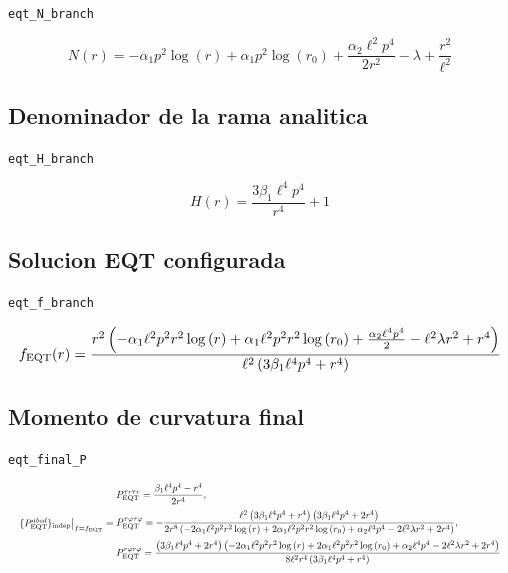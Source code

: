 \documentclass[11pt,a4paper]{article}
\begin{document}
\noindent\texttt{eqt\_N\_branch}\par\nopagebreak[4]

\[
N(r) = - \alpha_{1} p^{2} \log{\left(r \right)} + \alpha_{1} p^{2} \log{\left(r_{0} \right)} + \frac{\alpha_{2} \ell^{2} p^{4}}{2 r^{2}} - \lambda + \frac{r^{2}}{\ell^{2}}
\]

\subsection{Denominador de la rama analitica}

\noindent\texttt{eqt\_H\_branch}\par\nopagebreak[4]

\[
H(r) = \frac{3 \beta_{1} \ell^{4} p^{4}}{r^{4}} + 1
\]

\subsection{Solucion EQT configurada}

\noindent\texttt{eqt\_f\_branch}\par\nopagebreak[4]

\[
\resizebox{\textwidth}{!}{$\displaystyle f_{\mathrm{EQT}}(r) = \frac{r^{2} \left(- \alpha_{1} \ell^{2} p^{2} r^{2} \log{\left(r \right)} + \alpha_{1} \ell^{2} p^{2} r^{2} \log{\left(r_{0} \right)} + \frac{\alpha_{2} \ell^{4} p^{4}}{2} - \ell^{2} \lambda r^{2} + r^{4}\right)}{\ell^{2} \left(3 \beta_{1} \ell^{4} p^{4} + r^{4}\right)}$}
\]

\subsection{Momento de curvatura final}

\noindent\texttt{eqt\_final\_P}\par\nopagebreak[4]

\[
\resizebox{\textwidth}{!}{$\displaystyle \{P^{abcd}_{\mathrm{EQT}}\}_{\mathrm{indep}}\big|_{f=f_{\mathrm{EQT}}} = \begin{aligned}&P_{\mathrm{EQT}}^{{\tau}{r}{\tau}{r}}=\frac{\beta_{1} \ell^{4} p^{4} - r^{4}}{2 r^{4}},\\[2pt]&P_{\mathrm{EQT}}^{{\tau}{\varphi}{\tau}{\varphi}}=- \frac{\ell^{2} \left(3 \beta_{1} \ell^{4} p^{4} + r^{4}\right) \left(3 \beta_{1} \ell^{4} p^{4} + 2 r^{4}\right)}{2 r^{8} \left(- 2 \alpha_{1} \ell^{2} p^{2} r^{2} \log{\left(r \right)} + 2 \alpha_{1} \ell^{2} p^{2} r^{2} \log{\left(r_{0} \right)} + \alpha_{2} \ell^{4} p^{4} - 2 \ell^{2} \lambda r^{2} + 2 r^{4}\right)},\\[2pt]&P_{\mathrm{EQT}}^{{r}{\varphi}{r}{\varphi}}=\frac{\left(3 \beta_{1} \ell^{4} p^{4} + 2 r^{4}\right) \left(- 2 \alpha_{1} \ell^{2} p^{2} r^{2} \log{\left(r \right)} + 2 \alpha_{1} \ell^{2} p^{2} r^{2} \log{\left(r_{0} \right)} + \alpha_{2} \ell^{4} p^{4} - 2 \ell^{2} \lambda r^{2} + 2 r^{4}\right)}{8 \ell^{2} r^{4} \left(3 \beta_{1} \ell^{4} p^{4} + r^{4}\right)}\end{aligned}$}
\]
\end{document}
